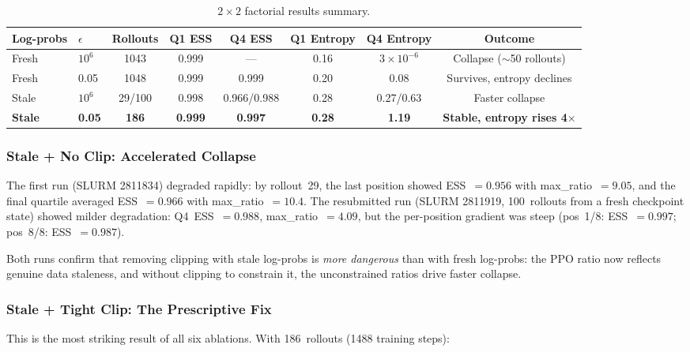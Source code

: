 \documentclass[11pt,a4paper]{article}
\begin{document}
\begin{table}[H]
\centering
\caption{$2 \times 2$ factorial results summary.}
\label{tab:factorial_results}
\begin{tabular}{@{}llcccccc@{}}
\toprule
\textbf{Log-probs} & $\epsilon$ & \textbf{Rollouts} & \textbf{Q1 ESS} & \textbf{Q4 ESS} & \textbf{Q1 Entropy} & \textbf{Q4 Entropy} & \textbf{Outcome} \\
\midrule
Fresh & $10^6$  & 1043 & 0.999 & --- & 0.16 & $3\times10^{-6}$ & Collapse ($\sim$50 rollouts) \\
Fresh & 0.05    & 1048 & 0.999 & 0.999 & 0.20 & 0.08 & Survives, entropy declines \\
\midrule
Stale & $10^6$  & 29/100 & 0.998 & 0.966/0.988 & 0.28 & 0.27/0.63 & Faster collapse \\
\textbf{Stale} & \textbf{0.05} & \textbf{186} & \textbf{0.999} & \textbf{0.997} & \textbf{0.28} & \textbf{1.19} & \textbf{Stable, entropy rises 4$\times$} \\
\bottomrule
\end{tabular}
\end{table}

\subsubsection{Stale + No Clip: Accelerated Collapse}

The first run (SLURM 2811834) degraded rapidly: by rollout~29, the last
position showed ESS~$= 0.956$ with max\_ratio~$= 9.05$, and the final
quartile averaged ESS~$= 0.966$ with max\_ratio~$= 10.4$.
The resubmitted run (SLURM 2811919, 100~rollouts from a fresh
checkpoint state) showed milder degradation: Q4~ESS~$= 0.988$,
max\_ratio~$= 4.09$, but the per-position gradient was steep
(pos~1/8: ESS~$= 0.997$; pos~8/8: ESS~$= 0.987$).

Both runs confirm that removing clipping with stale log-probs is
\emph{more dangerous} than with fresh log-probs: the PPO ratio now
reflects genuine data staleness, and without clipping to constrain it,
the unconstrained ratios drive faster collapse.

\subsubsection{Stale + Tight Clip: The Prescriptive Fix}

This is the most striking result of all six ablations.
With 186~rollouts (1488 training steps):
\end{document}
